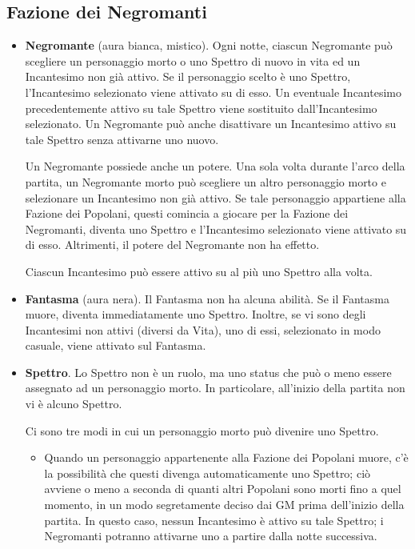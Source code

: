 \documentclass[a4paper,10pt]{article}
\begin{document}
\subsection*{Fazione dei Negromanti}
\label{negromanti}

\begin{itemize}

	\item {\bf Negromante} (aura bianca, mistico). Ogni notte, ciascun Negromante può scegliere un personaggio morto o uno Spettro di nuovo in vita ed un Incantesimo non già attivo.	Se il personaggio scelto è uno Spettro, l'Incantesimo selezionato viene attivato su di esso.
	Un eventuale Incantesimo precedentemente attivo su tale Spettro viene sostituito dall'Incantesimo selezionato.
	Un Negromante può anche disattivare un Incantesimo attivo su tale Spettro senza attivarne uno nuovo.
	
	Un Negromante possiede anche un potere. Una sola volta durante l'arco della partita, un Negromante morto può scegliere un altro personaggio morto e selezionare un Incantesimo non già attivo. Se tale personaggio appartiene alla Fazione dei Popolani, questi comincia a giocare per la Fazione dei Negromanti, diventa uno Spettro e l'Incantesimo selezionato viene attivato su di esso. Altrimenti, il potere del Negromante non ha effetto.
	
	Ciascun Incantesimo può essere attivo su al più uno Spettro alla volta.
 
	\item {\bf Fantasma} (aura nera). Il Fantasma non ha alcuna abilità. Se il Fantasma muore, diventa immediatamente uno Spettro. Inoltre, se vi sono degli Incantesimi non attivi (diversi da Vita), uno di essi, selezionato in modo casuale, viene attivato sul Fantasma.

	\item {\bf Spettro}. Lo Spettro non è un ruolo, ma uno status che può o meno essere assegnato ad un personaggio morto. In particolare, all'inizio della partita non vi è alcuno Spettro.
	
	Ci sono tre modi in cui un personaggio morto può divenire uno Spettro.
	
	\begin{itemize}
		\item Quando un personaggio appartenente alla Fazione dei Popolani muore, c'è la possibilità che questi divenga automaticamente uno Spettro; ciò avviene o meno a seconda di quanti altri Popolani sono morti fino a quel momento, in un modo segretamente deciso dai GM prima dell'inizio della partita. In questo caso, nessun Incantesimo è attivo su tale Spettro; i Negromanti potranno attivarne uno a partire dalla notte successiva.
		

\end{itemize}
\end{itemize}
\end{document}
